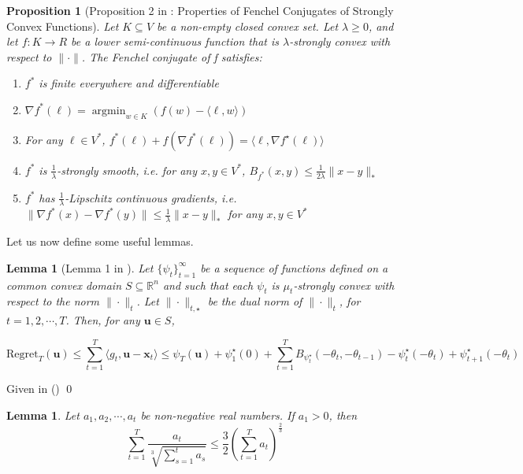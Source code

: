 \documentclass{article}
\newtheorem{lemma}[theorem]{Lemma}
\newtheorem{proposition}[theorem]{Proposition}
\newcommand{\R}{\mathbb{R}}
\newcommand{\argmin}{\mathop{\text{argmin}}}
\newcommand{\Regret}{\text{Regret}}
\newcommand{\bx}{\mathbf{x}}
\newcommand{\bu}{\mathbf{u}}
\begin{document}
\begin{proposition}[Proposition 2 in \cite{orabona_generalized_2014}: Properties of Fenchel Conjugates of Strongly
  Convex Functions]\label{prop:1}
  Let $K \subseteq V$ be a non-empty closed convex set. Let $\lambda \geq 0$, and let $f: K \rightarrow R$ be a lower
  semi-continuous function that is $\lambda$-strongly convex with respect to $\| \cdot \|$. The Fenchel conjugate of f
  satisfies:

  \begin{enumerate}
    \item $f^*$ is finite everywhere and differentiable
    \item $\nabla f^* (\ell) = \argmin_{w \in K}(f(w) - \langle \ell, w \rangle)$
    \item For any $\ell \in V^*$, $f^*(\ell) + f(\nabla f^*(\ell)) = \langle \ell, \nabla f^\star (\ell) \rangle$
    \item $f^*$ is $\frac{1}{\lambda}$-strongly smooth, i.e. for any $x, y \in V^*$, $B_{f^*}(x, y) \leq
      \frac{1}{2\lambda}\|x - y \|_*$
    \item $f^*$ has $\frac{1}{\lambda}$-Lipschitz continuous gradients, i.e. $\| \nabla f^*(x) - \nabla f^*(y)\| \leq
      \frac{1}{\lambda}\|x - y\|_*$ for any $x, y \in V^*$
  \end{enumerate}
\end{proposition}

Let us now define some useful lemmas.

\begin{lemma}[Lemma 1 in \cite{orabona_generalized_2014}] \label{lemma:1}
  Let $\{\psi_t\}_{t=1}^\infty$ be a sequence of functions defined on a common convex domain $S \subseteq \R^n$ and
  such that each $\psi_t$ is $\mu_t$-strongly convex with respect to the norm $\|\cdot\|_t$. Let $\|\cdot\|_{t, \star}$ be
  the dual norm of $\| \cdot \|_t$, for $t = 1, 2, \cdots, T$. Then, for any $\bu \in S$,

  \[
    \Regret _T (\bu) \leq \sum\limits_{t=1}^T \langle g_t, \bu - \bx_t \rangle \leq \psi_{T}(\bu) + \psi_{1}^\star (0) +
    \sum\limits_{t=1}^T B_{\psi_{t}^\star}(-\theta_t, -\theta_{t-1}) - \psi_{t}^\star (-\theta_t) +
    \psi_{t+1}^\star(-\theta_t)
  \]
\end{lemma}

\proof Given in (\cite{orabona_generalized_2014})
\qed

\begin{lemma} \label{lemma:2}
  Let $a_1, a_2, \cdots, a_t$ be non-negative real numbers. If $a_1 > 0$, then
  \[
    \sum\limits_{t=1}^T \frac{a_t}{\sqrt[3]{\sum\limits_{s=1}^t a_s}} \leq \frac{3}{2}\left(\sum\limits_{t=1}^T
    a_t\right)^\frac{2}{3}
  \]
\end{lemma}
\end{document}
